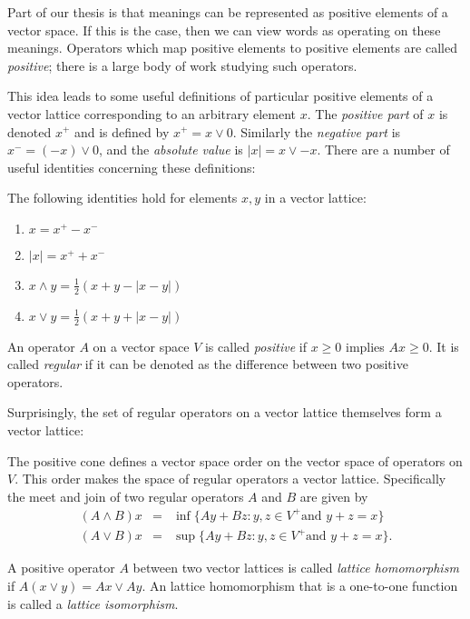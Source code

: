 Part of our thesis is that meanings can be represented as positive elements of a vector space. If this is the case, then we can view words as operating on these meanings. Operators which map positive elements to positive elements are called \emph{positive}; there is a large body of work studying such operators.

This idea leads to some useful definitions of particular positive elements of a vector lattice corresponding to an arbitrary element $x$. The \emph{positive part} of $x$ is denoted $x^+$ and is defined by $x^+ = x \lor 0$. Similarly the \emph{negative part} is $x^- = (-x)\lor 0$, and the \emph{absolute value} is $|x| = x \lor -x$. There are a number of useful identities concerning these definitions:
\begin{prop}
The following identities hold for elements $x,y$ in a vector lattice:
\begin{enumerate}[\indent(a).]
\item $x = x^+ - x^-$
\item $|x| = x^+ + x^-$
\item $x\land y = \frac{1}{2}(x + y - |x - y|)$
\item $x\lor y =  \frac{1}{2}(x + y + |x - y|)$
\end{enumerate}
\end{prop}

\begin{defn}
An operator $A$ on a vector space $V$ is called \emph{positive} if $x \ge 0$ implies $Ax \ge 0$. It is called \emph{regular} if it can be denoted as the difference between two positive operators.
\end{defn}


Surprisingly, the set of regular operators on a vector lattice themselves form a vector lattice:
\begin{prop}
The positive cone defines a vector space order on the vector space of operators on $V$. This order makes the space of regular operators a vector lattice. Specifically the meet and join of two regular operators $A$ and $B$ are given by
\begin{eqnarray*}
(A \land B)x & = & \inf\{Ay + Bz : y,z \in V^+ \text{and } y + z = x\}\\
(A \lor B)x & = & \sup\{Ay + Bz : y,z \in V^+ \text{and } y + z = x\}.
\end{eqnarray*}
\end{prop}

\begin{defn}
A positive operator $A$ between two vector lattices is called \emph{lattice homomorphism} if $A(x \lor y) = Ax \lor Ay$. An lattice homomorphism that is a one-to-one function is called a \emph{lattice isomorphism}.
\end{defn}

